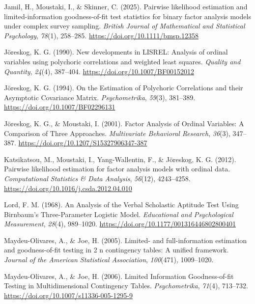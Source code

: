 \documentclass[
  letterpaper,
  DIV=11,
  numbers=noendperiod]{scrartcl}
\newlength{\cslhangindent}
\newenvironment{CSLReferences}[2] %
 {\begin{list}{}{%
  \setlength{\itemindent}{0pt}
  \setlength{\leftmargin}{0pt}
  \setlength{\parsep}{0pt}
  \ifodd #1
   \setlength{\leftmargin}{\cslhangindent}
   \setlength{\itemindent}{-1\cslhangindent}
  \fi
  \setlength{\itemsep}{#2\baselineskip}}}
 {\end{list}}
\begin{document}
\begin{CSLReferences}{1}{0}
Jamil, H., Moustaki, I., \& Skinner, C. (2025). Pairwise likelihood
estimation and limited-information goodness-of-fit test statistics for
binary factor analysis models under complex survey sampling.
\emph{British Journal of Mathematical and Statistical Psychology},
\emph{78}(1), 258--285. \url{https://doi.org/10.1111/bmsp.12358}

Jöreskog, K. G. (1990). New developments in {LISREL}: Analysis of
ordinal variables using polychoric correlations and weighted least
squares. \emph{Quality and Quantity}, \emph{24}(4), 387--404.
\url{https://doi.org/10.1007/BF00152012}

Jöreskog, K. G. (1994). On the {Estimation} of {Polychoric Correlations}
and their {Asymptotic Covariance Matrix}. \emph{Psychometrika},
\emph{59}(3), 381--389. \url{https://doi.org/10.1007/BF02296131}

Jöreskog, K. G., \& Moustaki, I. (2001). Factor {Analysis} of {Ordinal
Variables}: {A Comparison} of {Three Approaches}. \emph{Multivariate
Behavioral Research}, \emph{36}(3), 347--387.
\url{https://doi.org/10.1207/S15327906347-387}

Katsikatsou, M., Moustaki, I., Yang-Wallentin, F., \& Jöreskog, K. G.
(2012). Pairwise likelihood estimation for factor analysis models with
ordinal data. \emph{Computational Statistics \& Data Analysis},
\emph{56}(12), 4243--4258.
\url{https://doi.org/10.1016/j.csda.2012.04.010}

Lord, F. M. (1968). An {Analysis} of the {Verbal Scholastic Aptitude
Test Using Birnbaum}'s {Three-Parameter Logistic Model}.
\emph{Educational and Psychological Measurement}, \emph{28}(4),
989--1020. \url{https://doi.org/10.1177/001316446802800401}

Maydeu-Olivares, A., \& Joe, H. (2005). Limited- and full-information
estimation and goodness-of-fit testing in 2 n contingency tables: {A}
unified framework. \emph{Journal of the American Statistical
Association}, \emph{100}(471), 1009--1020.

Maydeu-Olivares, A., \& Joe, H. (2006). Limited {Information
Goodness-of-fit Testing} in {Multidimensional Contingency Tables}.
\emph{Psychometrika}, \emph{71}(4), 713--732.
\url{https://doi.org/10.1007/s11336-005-1295-9}


\end{CSLReferences}
\end{document}

